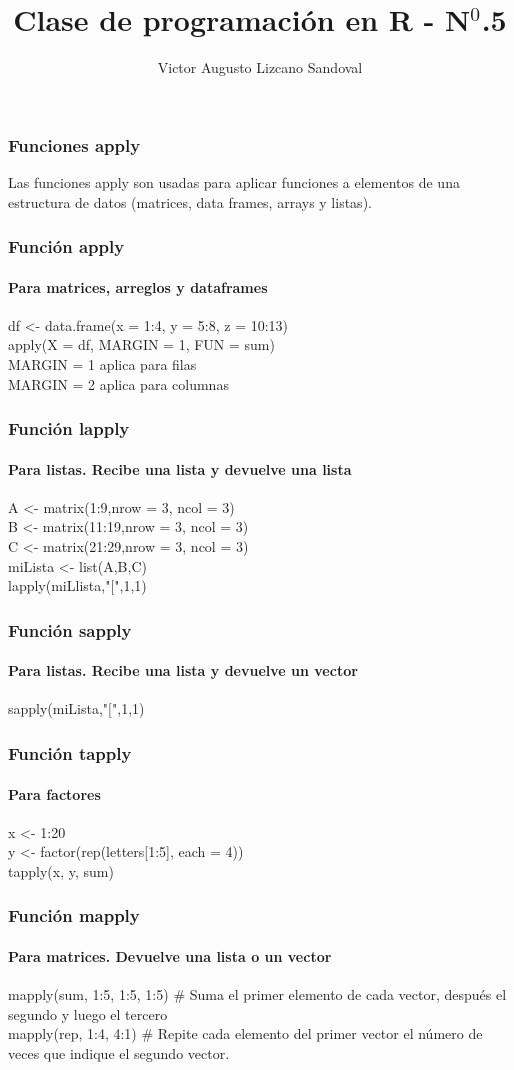 \documentclass[12pt]{beamer}
\begin{document}
	\author{Victor Augusto Lizcano Sandoval}
	\title{Clase de programación en R - N$^{0}$.5}
	\begin{frame}[plain]
		\maketitle
	\end{frame}
	
	\begin{frame}
		\frametitle{Funciones apply}
		Las funciones apply son  usadas para aplicar funciones a elementos de una estructura de datos (matrices, data frames, arrays y listas).
	\end{frame}

\begin{frame}
	\frametitle{Función apply}
	\framesubtitle{Para matrices, arreglos y dataframes}
	df <- data.frame(x = 1:4, y = 5:8, z = 10:13)\\
	apply(X = df, MARGIN = 1, FUN = sum)\\
	MARGIN = 1 aplica para filas\\
	MARGIN = 2 aplica para columnas
\end{frame}

\begin{frame}
	\frametitle{Función lapply}
	\framesubtitle{Para listas. Recibe una lista y devuelve una lista}
	A <- matrix(1:9,nrow = 3, ncol = 3)\\
	B <- matrix(11:19,nrow = 3, ncol = 3)\\
	C <- matrix(21:29,nrow = 3, ncol = 3)\\
	miLista <- list(A,B,C)\\
	lapply(miLlista,"$[$",1,1)
\end{frame}

\begin{frame}
	\frametitle{Función sapply}
	\framesubtitle{Para listas. Recibe una lista y devuelve un vector}
	sapply(miLista,"$[$",1,1)
\end{frame}

\begin{frame}
	\frametitle{Función tapply}
	\framesubtitle{Para factores}
	x <- 1:20\\
	y <- factor(rep(letters[1:5], each = 4))\\
	tapply(x, y, sum)
\end{frame}


\begin{frame}
	\frametitle{Función mapply}
	\framesubtitle{Para matrices. Devuelve una lista o un vector}
	mapply(sum, 1:5, 1:5, 1:5) $\#$ Suma el primer elemento de cada vector, después el segundo y luego el tercero\\
	mapply(rep, 1:4, 4:1) $\#$ Repite cada elemento del primer vector el número de veces que indique el segundo vector.
\end{frame}
\end{document}
